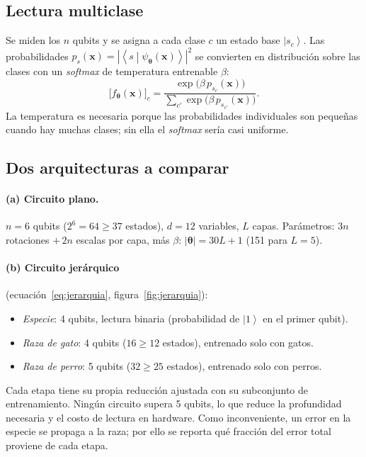 \documentclass[11pt,letterpaper]{article}
\providecommand{\ket}[1]{\left|#1\right\rangle}
\providecommand{\braket}[2]{\left\langle#1\middle|#2\right\rangle}
\begin{document}
\subsection{Lectura multiclase}
Se miden los $n$ qubits y se asigna a cada clase $c$ un estado base $\ket{s_c}$. Las probabilidades
$p_{s}(\bm{x})=|\braket{s}{\psi_{\bm\theta}(\bm{x})}|^2$ se convierten en distribución sobre las
clases con un \emph{softmax} de temperatura entrenable $\beta$:
\begin{equation}
\big[f_{\bm\theta}(\bm{x})\big]_c=\frac{\exp\!\big(\beta\,p_{s_c}(\bm{x})\big)}
{\sum_{c'}\exp\!\big(\beta\,p_{s_{c'}}(\bm{x})\big)}.
\end{equation}
La temperatura es necesaria porque las probabilidades individuales son pequeñas cuando hay muchas
clases; sin ella el \emph{softmax} sería casi uniforme.

\subsection{Dos arquitecturas a comparar}
\paragraph{(a) Circuito plano.} $n=6$ qubits ($2^6=64\geq37$ estados), $d=12$ variables, $L$ capas.
Parámetros: $3n$ rotaciones $+\,2n$ escalas por capa, más $\beta$: $|\bm\theta|=30L+1$
(151 para $L=5$).

\paragraph{(b) Circuito jerárquico} (ecuación~\ref{eq:jerarquia}, figura~\ref{fig:jerarquia}):
\begin{itemize}[leftmargin=*]
\item \emph{Especie}: 4 qubits, lectura binaria (probabilidad de $\ket{1}$ en el primer qubit).
\item \emph{Raza de gato}: 4 qubits ($16\geq12$ estados), entrenado solo con gatos.
\item \emph{Raza de perro}: 5 qubits ($32\geq25$ estados), entrenado solo con perros.
\end{itemize}
Cada etapa tiene su propia reducción ajustada con su subconjunto de entrenamiento. Ningún circuito
supera 5 qubits, lo que reduce la profundidad necesaria y el costo de lectura en hardware. Como
inconveniente, un error en la especie se propaga a la raza; por ello se reporta qué fracción del
error total proviene de cada etapa.
\end{document}
